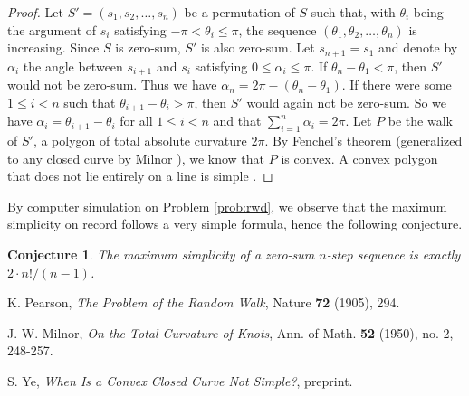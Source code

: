 \documentclass{amsart}
\newtheorem{conjecture}[proposition]{Conjecture}
\theoremstyle{definition}
\theoremstyle{problem}
\theoremstyle{remark}
\begin{document}
\begin{proof}
    Let $S'=(s_1,s_2,\dots,s_n)$ be a permutation of $S$ such that, with
    $\theta_i$ being the argument of $s_i$ satisfying $-\pi<\theta_i\le\pi$,
    the sequence $(\theta_1,\theta_2,\dots,\theta_n)$ is increasing.
    Since $S$ is zero-sum, $S'$ is also zero-sum.
    Let $s_{n+1}=s_1$ and denote by $\alpha_i$ the angle between
    $s_{i+1}$ and $s_i$ satisfying $0\le\alpha_i\le\pi$.
    If $\theta_n-\theta_1<\pi$, then $S'$ would not be zero-sum.
    Thus we have $\alpha_n=2\pi-(\theta_n-\theta_1)$.
    If there were some $1\le i<n$ such that $\theta_{i+1}-\theta_{i}>\pi$,
    then $S'$ would again not be zero-sum. So we have $\alpha_i=\theta_{i+1}-\theta_i$
    for all $1\le i<n$ and that $\sum_{i=1}^n\alpha_i=2\pi$.
    Let $P$ be the walk of $S'$, a polygon of total absolute curvature $2\pi$.
    By Fenchel's theorem (generalized to any closed curve by Milnor
    \cite[Theorem 3.4]{milnor}), we know that $P$ is convex.
    A convex polygon that does not lie entirely on a line is simple \cite{ye}.
\end{proof}

By computer simulation on Problem \ref{prob:rwd}, we observe that the maximum
simplicity on record follows a very simple formula, hence the following conjecture.

\begin{conjecture}
    \label{conj:value_formula}
    The maximum simplicity of a zero-sum $n$-step sequence
    is exactly $2\cdot n!/(n-1)$.
\end{conjecture}

\begin{thebibliography}{9}

    K. Pearson,
    \emph{The Problem of the Random Walk},
    Nature \textbf{72} (1905), 294.

    J. W. Milnor,
    \emph{On the Total Curvature of Knots},
    Ann. of Math.
    \textbf{52} (1950), no. 2, 248-257.

    S. Ye,
    \emph{When Is a Convex Closed Curve Not Simple?},
    preprint.

\end{thebibliography}
\end{document}
